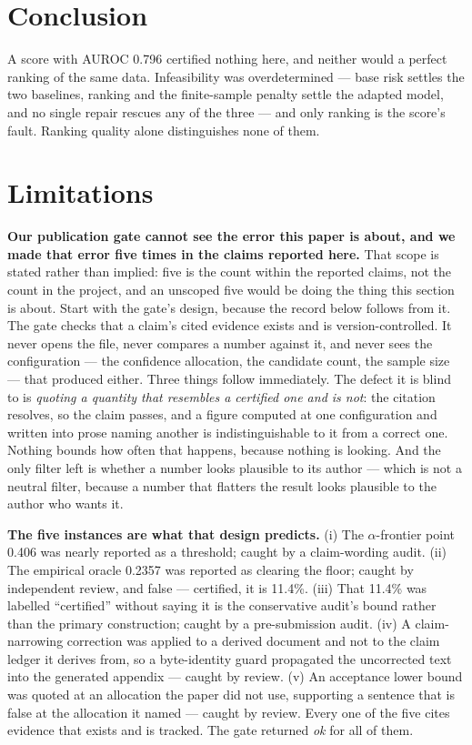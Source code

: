 \documentclass[11pt]{article}
\begin{document}
\section{Conclusion}

A score with AUROC 0.796 certified nothing here, and neither would a perfect ranking of the same
data. Infeasibility was overdetermined --- base risk settles the two baselines, ranking and the
finite-sample penalty settle the adapted model, and no single repair rescues any of the three ---
and only ranking is the score's fault. Ranking quality alone distinguishes
none of them.

\section*{Limitations}
\label{sec:limitations}

\textbf{Our publication gate cannot see the error this paper is about, and we made that error five
times in the claims reported here.} That scope is stated rather than implied: five is the count
within the reported claims, not the count in the project, and an unscoped five would be doing the
thing this section is about. Start with the gate's design, because the record below follows from
it. The gate checks
that a claim's cited evidence exists and is version-controlled. It never opens the file, never
compares a number against it, and never sees the configuration --- the confidence allocation, the
candidate count, the sample size --- that produced either. Three things follow immediately. The
defect it is blind to is \emph{quoting a quantity that resembles a certified one and is not}: the
citation resolves, so the claim passes, and a figure computed at one configuration and written into
prose naming another is indistinguishable to it from a correct one. Nothing bounds how often that
happens, because nothing is looking. And the only filter left is whether a number looks plausible
to its author --- which is not a neutral filter, because a number that flatters the result looks
plausible to the author who wants it.

\textbf{The five instances are what that design predicts.} (i) The $\alpha$-frontier point 0.406
was nearly reported as a threshold; caught by a claim-wording audit. (ii) The empirical oracle
0.2357 was reported as clearing the floor; caught by independent review, and false --- certified,
it is 11.4\%. (iii) That 11.4\% was labelled ``certified'' without saying it is the conservative
audit's bound rather than the primary construction; caught by a pre-submission audit. (iv) A
claim-narrowing correction was applied to a derived document and not to the claim ledger it derives
from, so a byte-identity guard propagated the uncorrected text into the generated appendix ---
caught by review. (v) An acceptance lower bound was quoted at an allocation the paper did not use,
supporting a sentence that is false at the allocation it named --- caught by review. Every one of
the five cites evidence that exists and is tracked. The gate returned \emph{ok} for all of them.
\end{document}
